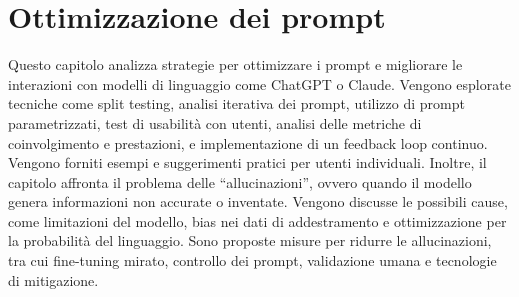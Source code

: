 \section{Ottimizzazione dei prompt}
    Questo capitolo analizza strategie per ottimizzare i prompt e migliorare le interazioni con modelli di linguaggio come ChatGPT o Claude. Vengono esplorate tecniche come split testing, analisi iterativa dei prompt, utilizzo di prompt parametrizzati, test di usabilità con utenti, analisi delle metriche di coinvolgimento e prestazioni, e implementazione di un feedback loop continuo. Vengono forniti esempi e suggerimenti pratici per utenti individuali. Inoltre, il capitolo affronta il problema delle ``allucinazioni'', ovvero quando il modello genera informazioni non accurate o inventate. Vengono discusse le possibili cause, come limitazioni del modello, bias nei dati di addestramento e ottimizzazione per la probabilità del linguaggio. Sono proposte misure per ridurre le allucinazioni, tra cui fine-tuning mirato, controllo dei prompt, validazione umana e tecnologie di mitigazione.

